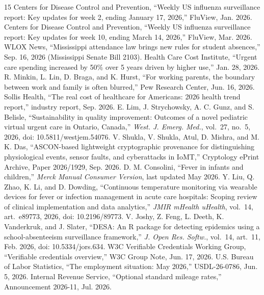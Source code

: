 \documentclass[journal]{IEEEtran}
\begin{document}
\begin{thebibliography}{15}
 Centers for Disease Control and Prevention, ``Weekly US influenza surveillance report: Key updates for week 2, ending January 17, 2026,'' FluView, Jan. 2026.
 Centers for Disease Control and Prevention, ``Weekly US influenza surveillance report: Key updates for week 10, ending March 14, 2026,'' FluView, Mar. 2026.
 WLOX News, ``Mississippi attendance law brings new rules for student absences,'' Sep. 16, 2026 (Mississippi Senate Bill 2103).
 Health Care Cost Institute, ``Urgent care spending increased by 50\% over 5 years driven by higher use,'' Jan. 28, 2026.
 R. Minkin, L. Lin, D. Braga, and K. Hurst, ``For working parents, the boundary between work and family is often blurred,'' Pew Research Center, Jun. 16, 2026.
 Sollis Health, ``The real cost of healthcare for Americans: 2026 health trend report,'' industry report, Sep. 2026.
 E. Lim, J. Strychowsky, A. C. Gunz, and S. Belisle, ``Sustainability in quality improvement: Outcomes of a novel pediatric virtual urgent care in Ontario, Canada,'' \emph{West. J. Emerg. Med.}, vol.~27, no.~5, 2026, doi: 10.5811/westjem.54076.
 V. Shukla, V. Shukla, Atul, D. Mishra, and M. K. Das, ``ASCON-based lightweight cryptographic provenance for distinguishing physiological events, sensor faults, and cyberattacks in IoMT,'' Cryptology ePrint Archive, Paper 2026/1929, Sep. 2026.
 D. M. Consolini, ``Fever in infants and children,'' \emph{Merck Manual Consumer Version}, last updated May 2026.
 Y. Liu, Q. Zhao, K. Li, and D. Dowding, ``Continuous temperature monitoring via wearable devices for fever or infection management in acute care hospitals: Scoping review of clinical implementation and data analytics,'' \emph{JMIR mHealth uHealth}, vol.~14, art.~e89773, 2026, doi: 10.2196/89773.
 V. Joshy, Z. Feng, L. Deeth, K. Vanderkruk, and J. Slater, ``DESA: An R package for detecting epidemics using a school-absenteeism surveillance framework,'' \emph{J. Open Res. Softw.}, vol.~14, art.~11, Feb. 2026, doi: 10.5334/jors.634.
 W3C Verifiable Credentials Working Group, ``Verifiable credentials overview,'' W3C Group Note, Jun. 17, 2026.
 U.S. Bureau of Labor Statistics, ``The employment situation: May 2026,'' USDL-26-0786, Jun. 5, 2026.
 Internal Revenue Service, ``Optional standard mileage rates,'' Announcement 2026-11, Jul. 2026.
\end{thebibliography}
\end{document}
